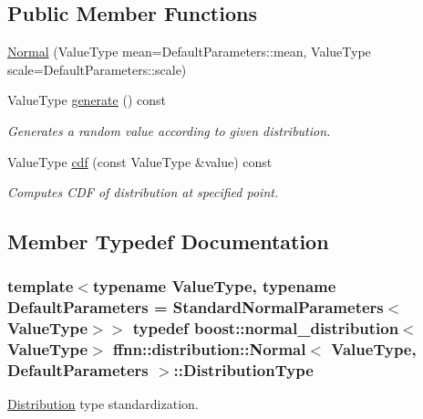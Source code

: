 \subsection*{Public Member Functions}
\begin{DoxyCompactItemize}
\item 
\hyperlink{classffnn_1_1distribution_1_1_normal_ae5838a524f4cbb4723c7b847da48748e}{Normal} (Value\-Type mean=Default\-Parameters\-::mean, Value\-Type scale=Default\-Parameters\-::scale)
\item 
Value\-Type \hyperlink{classffnn_1_1distribution_1_1_normal_abaaeca05e27923d319a452b78dda379b}{generate} () const 
\begin{DoxyCompactList}\small\item\em Generates a random value according to given distribution. \end{DoxyCompactList}\item 
Value\-Type \hyperlink{classffnn_1_1distribution_1_1_normal_aff824a6924a11a83c0ac419190e9b971}{cdf} (const Value\-Type \&value) const 
\begin{DoxyCompactList}\small\item\em Computes C\-D\-F of distribution at specified point. \end{DoxyCompactList}\end{DoxyCompactItemize}


\subsection{Member Typedef Documentation}
\hypertarget{classffnn_1_1distribution_1_1_normal_a30ff73a118402782feff21954e71b3a5}{
\subsubsection[{Distribution\-Type}]{\setlength{\rightskip}{0pt plus 5cm}template$<$typename Value\-Type, typename Default\-Parameters = Standard\-Normal\-Parameters$<$\-Value\-Type$>$$>$ typedef boost\-::normal\-\_\-distribution$<$Value\-Type$>$ {\bf ffnn\-::distribution\-::\-Normal}$<$ Value\-Type, Default\-Parameters $>$\-::{\bf Distribution\-Type}}}\label{classffnn_1_1distribution_1_1_normal_a30ff73a118402782feff21954e71b3a5}


\hyperlink{classffnn_1_1distribution_1_1_distribution}{Distribution} type standardization. 

